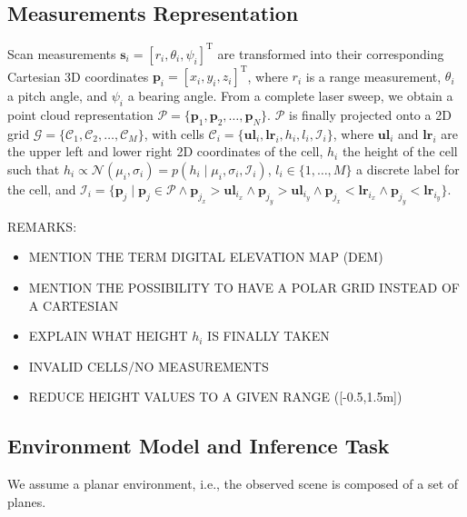 \subsection{Measurements Representation}
Scan measurements $\mathbf{s}_i=[r_i,\theta_i,\psi_i]^\text{T}$ are transformed
into their corresponding Cartesian 3D coordinates $\mathbf{p}_i=[x_i,y_i,z_i]
^\text{T}$, where $r_i$ is a range measurement, $\theta_i$ a pitch angle, and
$\psi_i$ a bearing angle. From a complete laser sweep, we obtain a point cloud
representation $\mathcal{P}=\{\mathbf{p}_1,\mathbf{p}_2,\dots,\mathbf{p}_N\}$.
$\mathcal{P}$ is finally projected onto a 2D grid $\mathcal{G}=\{\mathcal{C}_1,
\mathcal{C}_2,\dots,\mathcal{C}_M\}$, with cells $\mathcal{C}_i=
\{\mathbf{ul}_i,\mathbf{lr}_i,h_i,l_i,\mathcal{I}_i\}$, where $\mathbf{ul}_i$
and $\mathbf{lr}_i$ are the upper left and lower right 2D coordinates of the
cell, $h_i$ the height of the cell such that $h_i\propto\mathcal{N}(\mu_i,
\sigma_i)=p(h_i\mid\mu_i,\sigma_i,\mathcal{I}_i)$, $l_i\in\{1,\dots,M\}$ a
discrete label for the cell, and $\mathcal{I}_i=\{\mathbf{p}_j\mid\mathbf{p}_j
\in\mathcal{P}\wedge\mathbf{p}_{j_x}>\mathbf{ul}_{i_x}\wedge\mathbf{p}_{j_y}>
\mathbf{ul}_{i_y}\wedge\mathbf{p}_{j_x}<\mathbf{lr}_{i_x}\wedge\mathbf{p}_{j_y}
<\mathbf{lr}_{i_y}\}$.

REMARKS:
\begin{itemize}
\item MENTION THE TERM DIGITAL ELEVATION MAP (DEM)
\item MENTION THE POSSIBILITY TO HAVE A POLAR GRID INSTEAD OF A CARTESIAN
\item EXPLAIN WHAT HEIGHT $h_i$ IS FINALLY TAKEN
\item INVALID CELLS/NO MEASUREMENTS
\item REDUCE HEIGHT VALUES TO A GIVEN RANGE ([-0.5,1.5m])
\end{itemize}

\subsection{Environment Model and Inference Task}
We assume a planar environment, i.e., the observed scene is composed of a set of
planes.
